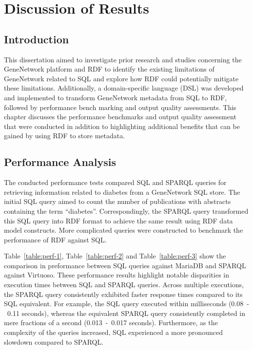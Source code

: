 \chapter{Discussion of Results}

\section{Introduction}

This dissertation aimed to investigate prior research and studies concerning the GeneNetwork platform and RDF to identify the existing limitations of GeneNetwork related to SQL and explore how RDF could potentially mitigate these limitations.  Additionally, a domain-specific language (DSL) was developed and implemented to transform GeneNetwork metadata from SQL to RDF, followed by performance bench marking and output quality assessments.  This chapter discusses the performance benchmarks and output quality assessment that were conducted in addition to highlighting additional benefits that can be gained by using RDF to store metadata.

\section{Performance Analysis}

The conducted performance tests compared SQL and SPARQL queries for retrieving information related to diabetes from a GeneNetwork SQL store.  The initial SQL query aimed to count the number of publications with abstracts containing the term ``diabetes''.  Correspondingly, the SPARQL query transformed this SQL query into RDF format to achieve the same result using RDF data model constructs.  More complicated queries were constructed to benchmark the performance of RDF against SQL.\@

Table~\ref{table:perf-1}, Table~\ref{table:perf-2} and Table~\ref{table:perf-3} show the comparison in preformance between SQL queries against MariaDB and SPARQL against Virtuoso.  These performance results highlight notable disparities in execution times between SQL and SPARQL queries.  Across multiple executions, the SPARQL query consistently exhibited faster response times compared to its SQL equivalent.  For example, the SQL query executed within milliseconds (0.08~-~0.11 seconds), whereas the equivalent SPARQL query consistently completed in mere fractions of a second (0.013~-~0.017 seconds).  Furthermore, as the complexity of the queries increased, SQL experienced a more pronounced slowdown compared to SPARQL\@.

